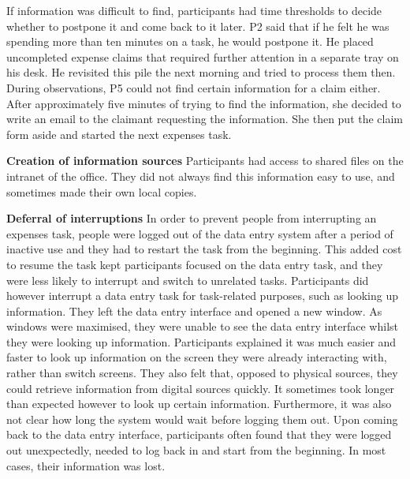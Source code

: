 If information was difficult to find, participants had time thresholds to decide whether to postpone it and come back to it later. P2 said that if he felt he was spending more than ten minutes on a task, he would postpone it. He placed uncompleted expense claims that required further attention in a separate tray on his desk. He revisited this pile the next morning and tried to process them then.
During observations, P5 could not find certain information for a claim either. After approximately five minutes of trying to find the information, she decided to write an email to the claimant requesting the information. She then put the claim form aside and started the next expenses task.
 
 \textbf{Creation of information sources}
Participants had access to shared files on the intranet of the office. They did not always find this information easy to use, and sometimes made their own local copies.

\textbf{Deferral of interruptions}
In order to prevent people from interrupting an expenses task, people were logged out of the data entry system after a period of inactive use and they had to restart the task from the beginning. This added cost to resume the task kept participants focused on the data entry task, and they were less likely to interrupt and switch to unrelated tasks.
Participants did however interrupt a data entry task for task-related purposes, such as looking up information. They left the data entry interface and opened a new window. As windows were maximised, they were unable to see the data entry interface whilst they were looking up information. Participants explained it was much easier and faster to look up information on the screen they were already interacting with, rather than switch screens. They also felt that, opposed to physical sources, they could retrieve information from digital sources quickly. It sometimes took longer than expected however to look up certain information. Furthermore, it was also not clear how long the system would wait before logging them out. Upon coming back to the data entry interface, participants often found that they were logged out unexpectedly, needed to log back in and start from the beginning. In most cases, their information was lost.

